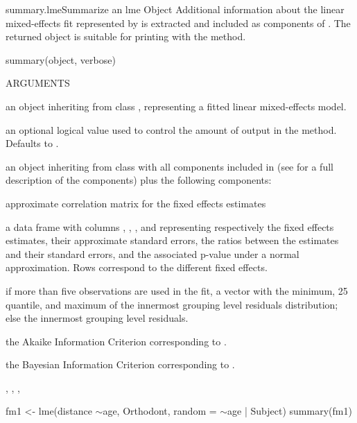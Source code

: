 \documentclass[pdftex]{article} \usepackage{url,graphicx}
\renewcommand{\Twiddle}{\mbox{\(\sim\)}}
\begin{document}
\begin{Helpfile}{summary.lme}{Summarize an lme Object}
Additional information about the linear mixed-effects fit represented
by  is extracted and included as components of
. The returned object is suitable for printing with the
 method.
\begin{Example}
summary(object, verbose)
\end{Example}
\begin{Argument}{ARGUMENTS}
\item[\Co{object:}]
an object inheriting from class , representing
a fitted linear mixed-effects model.
\item[\Co{verbose:}]
an optional logical value used to control the amount of
output in the  method. Defaults to
.
\end{Argument}
an object inheriting from class  with all components
included in  (see  for a full
description of the components) plus the following components:
\begin{Argument}{}
\vspace{-16pt} 
\item[\Co{corFixed:}]
approximate correlation matrix for the fixed effects
estimates 
\item[\Co{zTable:}]
a data frame with columns ,
, , and  representing
respectively the fixed effects estimates, their approximate standard
errors, the ratios between the estimates and their standard errors,
and the associated p-value under a normal approximation. Rows
correspond to the different fixed effects.
\item[\Co{residuals:}]
if more than five observations are used in the
 fit, a vector with the minimum, 25
quantile, and maximum of the innermost grouping level residuals
distribution; else the innermost grouping level residuals.
\item[\Co{AIC:}]
the Akaike Information Criterion corresponding to
.
\item[\Co{BIC:}]
the Bayesian Information Criterion corresponding to
.
\end{Argument}
, , ,
\need 15pt
\vspace{-16pt} 
\begin{Example}
fm1 <- lme(distance \Twiddle age, Orthodont, random = \Twiddle age | Subject)
summary(fm1)
\end{Example}
\end{Helpfile}
\end{document}
